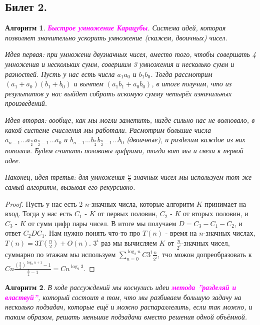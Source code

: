 \documentclass[a4paper]{article}
\theoremstyle{indented}
\newtheorem{alg}{Алгоритм}
\theoremstyle{definition}
\theoremstyle{remark}
\begin{document}
\subsection{Билет 2.}

\begin{alg}
    \textcolor{magenta}{\hypertarget{t-1}{\textbf{Быстрое умножение Карацубы}}}. Система идей, которая позволяет значительно ускорить умножение (скажем, двоичных) чисел. \ 

    Идея первая: при умножени двузначных чисел, вместо того, чтобы совершать 4 умножения и нескольких сумм, совершим 3 умножения и несколько сумм и разностей. Пусть у нас есть числа $a_1a_0$ и $b_1b_0$. Тогда рассмотрим $(a_1+a_0)(b_1+b_0)$ и вычтем $(a_1b_1+a_0b_0)$, в итоге получим, что из результатов у нас выйдет собрать искомую сумму четырёх изначальных произведений. \ 
     
    Идея вторая: вообще, как мы могли заметить, нигде сильно нас не волновало, в какой системе счисления мы работали. Расмотрим большие числа $a_{n-1}\ldots a_{\frac{n}{2}}a_{\frac{n}{2}-1}\ldots a_0$ и $b_{n-1}\ldots b_{\frac{n}{2}}b_{\frac{n}{2}-1}\ldots b_0$ (двоичные), и разделим каждое из них пополам. Будем считать половины цифрами, тогда вот мы и свели к первой идее. \ 

    Наконец, идея третья: для умножения $\frac{n}{2}$-значных чисел мы используем тот же самый алгоритм, вызывая его рекурсивно. 
\end{alg}

\begin{proof}
    Пусть у нас есть 2 $n$-значных числа, которые алгоритм $K$ принимает на вход. Тогда у нас есть $C_1$ - $K$ от первых половин, $C_2$ - $K$ от вторых половин, и $C_3$ - $K$ от сумм цифр пары чисел. В итоге мы получаем $D=C_3-C_1-C_2$, и ответ $C_2 D C_1$. Нам нужно понять что-то про $T(n)$ - время на $n$-значных числах, $T(n)=3T(\frac{n}{2})+O(n)$. $3^i$ раз мы вычисляем $K$ от $\frac{n}{2^i}$-значных чисел, суммарно по этажам мы используем $\sum_{n=0}^{\log_2 n}C 3^i \frac{n}{2^i}$, тчо можон допреобразовать к $Cn\frac{(\frac{3}{2})^{\log_2 n+1}-1}{\frac{3}{2}-1}=Cn^{\log_2 3}$.
\end{proof}

\begin{alg}
    В ходе рассуждений мы коснулись идеи \textcolor{magenta}{\hypertarget{t-2}{\textbf{метода ''разделяй и властвуй''}}}, который состоит в том, что мы разбиваем большую задачу на несколько подзадач, которые ещё и можно распараллелить, если так можно, и таким образом, решать меньшие подзадачи вместо решения одной объёмной.
\end{alg}
\end{document}
